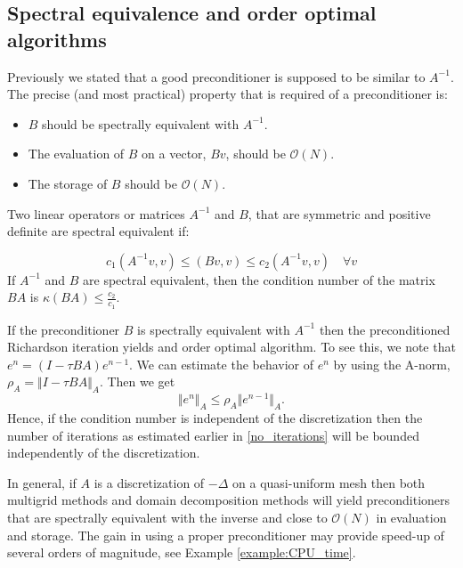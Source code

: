 \subsection{Spectral equivalence and order optimal algorithms} 

Previously we stated that a good preconditioner is supposed to be similar to $A^{-1}$. 
The precise (and most practical) property that is required of a preconditioner
is: 
\begin{itemize}
\item
  $B$ should be spectrally equivalent with $A^{-1}$.
\item
  The evaluation of $B$ on a vector, $Bv$, should be $\mathcal{O}(N)$.
\item
  The storage of $B$ should be $\mathcal{O}(N)$.
\end{itemize}



\begin{definition}Two linear operators or matrices $A^{-1}$ and $B$, that are symmetric 
and positive definite are spectral equivalent if:

\begin{equation}\label{eq:spectral_equivalence}%
c_1(A^{-1}v,v) \le (Bv,v) \le c_2(A^{-1}v,v) \quad \forall v
\end{equation}
If $A^{-1}$ and $B$ are spectral equivalent, then the condition number 
of the matrix $BA$ is $\kappa(BA) \le \frac{c_2}{c_1}$.
\end{definition}

If the preconditioner $B$ is spectrally equivalent with $A^{-1}$ 
then the preconditioned  Richardson iteration yields 
and order optimal algorithm.  
To see this, we note that $e^n = (I-\tau BA)e^{n-1}$. We can estimate 
the behavior of $e^n$ by using the A-norm, $\rho_A = \Vert I - \tau BA\Vert_A$. 
Then we get
\[
\Vert e^n\Vert_A \le \rho _A \Vert e^{n-1}\Vert_A.
\]
Hence, if the condition number is independent of the discretization 
then the number of iterations  as estimated earlier in \eqref{no_iterations} 
will be bounded independently of the discretization.  

In general, if $A$ is a discretization of $-\Delta$ on a quasi-uniform mesh  
then both multigrid methods and domain decomposition methods will yield 
preconditioners that are spectrally equivalent with the inverse and close 
to $\mathcal{O}(N)$ in evaluation and storage.  
The gain in using a proper preconditioner may provide speed-up of several
orders of magnitude, see Example \ref{example:CPU_time}.  








